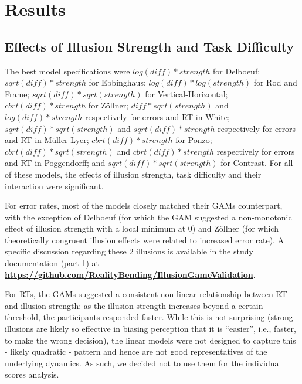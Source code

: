 \documentclass[
  man,floatsintext]{apa6}
\begin{document}
\hypertarget{results}{%
\section{Results}\label{results}}

\hypertarget{effects-of-illusion-strength-and-task-difficulty}{%
\subsection{Effects of Illusion Strength and Task Difficulty}\label{effects-of-illusion-strength-and-task-difficulty}}

The best model specifications were \(log(diff)*strength\) for Delboeuf; \(sqrt(diff)*strength\) for Ebbinghaus; \(log(diff)*log(strength)\) for Rod and Frame; \(sqrt(diff)*sqrt(strength)\) for Vertical-Horizontal; \(cbrt(diff)*strength\) for Zöllner; \(diff*sqrt(strength)\) and \(log(diff)*strength\) respectively for errors and RT in White; \(sqrt(diff)*sqrt(strength)\) and \(sqrt(diff)*strength\) respectively for errors and RT in Müller-Lyer; \(cbrt(diff)*strength\) for Ponzo; \(cbrt(diff)*sqrt(strength)\) and \(cbrt(diff)*strength\) respectively for errors and RT in Poggendorff; and \(sqrt(diff)*sqrt(strength)\) for Contrast. For all of these models, the effects of illusion strength, task difficulty and their interaction were significant.

For error rates, most of the models closely matched their GAMs counterpart, with the exception of Delboeuf (for which the GAM suggested a non-monotonic effect of illusion strength with a local minimum at 0) and Zöllner (for which theoretically congruent illusion effects were related to increased error rate). A specific discussion regarding these 2 illusions is available in the study documentation (part 1) at \href{https://github.com/RealityBending/IllusionGameValidation}{\textbf{https://github.com/RealityBending/IllusionGameValidation}}.

For RTs, the GAMs suggested a consistent non-linear relationship between RT and illusion strength: as the illusion strength increases beyond a certain threshold, the participants responded faster. While this is not surprising (strong illusions are likely so effective in biasing perception that it is ``easier'', i.e., faster, to make the wrong decision), the linear models were not designed to capture this - likely quadratic - pattern and hence are not good representatives of the underlying dynamics. As such, we decided not to use them for the individual scores analysis.
\end{document}
